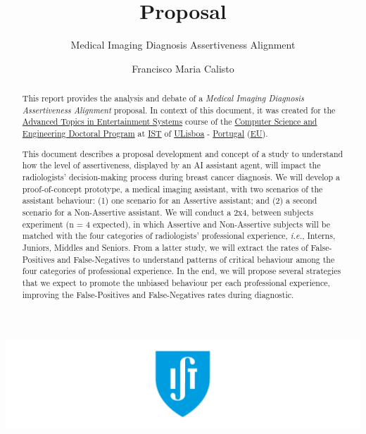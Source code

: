 \documentclass[sigchi]{acmart}
\begin{document}
\title{Proposal}
\subtitle{Medical Imaging Diagnosis Assertiveness Alignment}

\author{Francisco Maria Calisto}

\renewcommand{\shortauthors}{Calisto}


\begin{abstract}

This report provides the analysis and debate of a \textit{Medical Imaging Diagnosis Assertiveness Alignment} proposal.
In context of this document, it was created for the \hyperlink{https://fenix.tecnico.ulisboa.pt/disciplinas/TASE4/2019-2020/2-semestre}{Advanced Topics in Entertainment Systems} course of the \hyperlink{https://fenix.tecnico.ulisboa.pt/cursos/deic/curriculo}{Computer Science and Engineering Doctoral Program} at \hyperlink{https://tecnico.ulisboa.pt/en/}{IST} of \hyperlink{https://www.ulisboa.pt/}{ULisboa} - \hyperlink{https://www.portugal.gov.pt/en/}{Portugal} (\hyperlink{https://europa.eu}{EU}).

This document describes a proposal development and concept of a study to understand how the level of assertiveness, displayed by an AI assistant agent, will impact the radiologists' decision-making process during breast cancer diagnosis.
We will develop a proof-of-concept prototype, a medical imaging assistant, with two scenarios of the assistant behaviour:
(1) one scenario for an Assertive assistant; and
(2) a second scenario for a Non-Assertive assistant.
We will conduct a 2x4, between subjects experiment (n = 4 expected), in which Assertive and Non-Assertive subjects will be matched with the four categories of radiologists' professional experience, {\it i.e.}, Interns, Juniors, Middles and Seniors.
From a latter study, we will extract the rates of False-Positives and False-Negatives to understand patterns of critical behaviour among the four categories of professional experience.
In the end, we will propose several strategies that we expect to promote the unbiased behaviour per each professional experience, improving the False-Positives and False-Negatives rates during diagnostic.

\end{abstract}

\begin{teaserfigure}
\includegraphics[width=\textwidth]{teaser}
\end{teaserfigure}


\maketitle



\break



\end{document}
